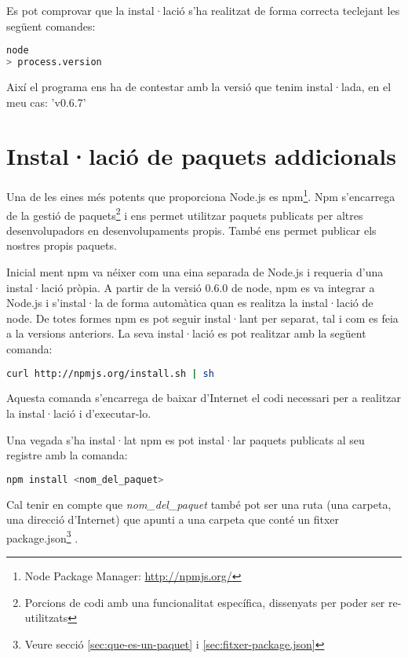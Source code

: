 Es pot comprovar que la instal·lació s'ha realitzat de forma correcta teclejant les següent comandes: 

\begin{lstlisting}[language=bash]
node
> process.version
\end{lstlisting}

Així el programa ens ha de contestar amb la versió que tenim instal·lada, en el meu cas: 'v0.6.7'

\section{Instal·lació de paquets addicionals}
\label{sec:paquets-adicionals}
Una de les eines més potents que proporciona Node.js es npm\footnote{Node Package Manager: \url{http://npmjs.org/}}.
Npm s'encarrega de la gestió de paquets\footnote{Porcions de codi amb una funcionalitat específica, dissenyats per poder ser re-utilitzats} i ens permet utilitzar paquets publicats per altres desenvolupadors en desenvolupaments propis. També ens permet publicar els nostres propis paquets. 

Inicial ment npm va néixer com una eina separada de Node.js i requeria d'una instal·lació pròpia. A partir de la versió 0.6.0 de node, npm es va integrar a Node.js i s'instal·la de forma automàtica quan es realitza la instal·lació de node. De totes formes npm es pot seguir instal·lant per separat, tal i com es feia a la versions anteriors. La seva instal·lació es pot realitzar amb la següent comanda:

\begin{lstlisting}[language=bash]
curl http://npmjs.org/install.sh | sh
\end{lstlisting}

Aquesta comanda s'encarrega de baixar d'Internet el codi necessari per a realitzar la instal·lació i d'executar-lo. 

Una vegada s'ha instal·lat npm es pot instal·lar paquets publicats al seu registre amb la comanda:

\begin{lstlisting}[language=bash]
npm install <nom_del_paquet>
\end{lstlisting}

Cal tenir en compte que \emph{nom\_del\_paquet} també pot ser una ruta (una carpeta, una direcció d'Internet) que apunti a una carpeta que conté un fitxer package.json\footnote{Veure secció \ref{sec:que-es-un-paquet} i \ref{sec:fitxer-package.json}} . 

